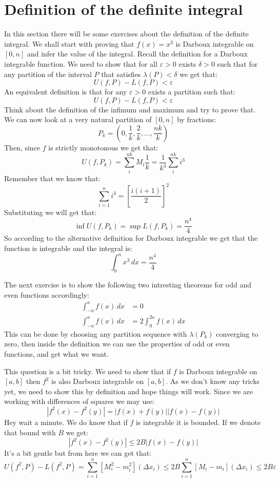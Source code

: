 \documentclass{article}
\theoremstyle{plain}
\begin{document}
	\newpage
	
	\section{Definition of the definite integral}
	In this section there will be some exercises about the definition
	of the definite integral. We shall start with proving that $f(x) = x^3$
	is Darboux integrable on $[0,n]$ and infer the value of the integral.
	Recall the definition for a Darboux integrable function. We need to show
	that for all $\varepsilon > 0$ exists $\delta > 0$ such that for any
	partition of the interval $P$ that satisfies $\lambda(P) < \delta$ we
	get that:
	\[
		U(f,P) - L(f,P) < \varepsilon
	\]
	An equivalent definition is that for any $\varepsilon > 0$ exists a
	partition such that:
	\[
		U(f,P) - L(f,P) < \varepsilon
	\]
	Think about the definition of the infimum and maximum and try to prove
	that. We can now look at a very natural partition of $[0,n]$ by fractions:
	\[
		P_k = \left(0,\frac 1k, \frac 2k, \dots, \frac {nk}{k}\right)
	\]
	Then, since $f$ is strictly monotonous we get that:
	\[
		U(f, P_k) = 
		\sum_{i}^{nk}{M_i\frac 1k} = 
		\frac {1}{k^4} \sum_{i}^{nk}{i^3}
	\]
	Remember that we know that:
	\[
		\sum_{i=1}^{n}{i^3} = \left[\frac{i(i+1)}{2}\right]^2
	\]
	Substituting we will get that:
	\[
		\inf U(f, P_k) = \sup L(f, P_k) = \frac{n^4}{4}
	\]
	So according to the alternative definition for Darboux integrable we
	get that the function is integrable and the integral is:
	\[
		\int_{0}^{n}{x^3\,dx} = \frac{n^4}{4}
	\]
	
	\newpage
	
	The next exercise is to show the following two intresting theorems for
	odd and even functions accordingly:
	\begin{align*}
		\int_{-a}^{a}{f(x)\,dx} &= 0 \\
		\int_{-a}^{a}{f(x)\,dx} &= 2\int_{0}^{2a}{f(x)\,dx}
	\end{align*}
	This can be done by choosing any partition sequence with $\lambda(P_k)$
	converging to zero, then inside the definition we can use the properties
	of odd or even functions, and get what we want.
	
	\newpage
	
	This question is a bit tricky. We need to show that if $f$ is Darboux
	integrable on $[a,b]$ then $f^2$ is also Darboux integrable on $[a,b]$.
	As we don't know any tricks yet, we need to show this by definition and
	hope things will work. Since we are working with differences of squares
	we may use:
	\[
		|f^2(x) - f^2(y)| = |f(x) + f(y)||f(x) - f(y)|
	\]
	Hey wait a minute. We do know that if $f$ is integrable it is bounded.
	If we denote that bound with $B$ we get:
	\[
		|f^2(x) - f^2(y)| \le 2B|f(x) - f(y)|
	\]
	It's a bit gentle but from here we can get that:
	\[
		U(f^2,P) - L(f^2,P) = \sum_{i=1}^{n}{[M^2_i-m^2_i](\Delta x_i)} \le
		2B\sum_{i=1}^{n}{[M_i-m_i](\Delta x_i)} \le 2B\varepsilon
	\]
	
\end{document}

